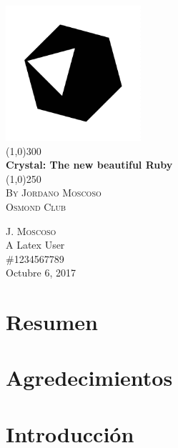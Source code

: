 \documentclass{article}
\begin{document}
\begin{titlepage}
	\begin{center}
	\includegraphics[width=5cm]{Title3-84413ce8.png}\\
	\line(1,0){300}\\
	[0.5cm]
	\huge{\bfseries Crystal: The new beautiful Ruby}\\
	[0.1cm]
	\line(1,0){250}\\
	\textsc{\LARGE By Jordano Moscoso}\\
	\textsc{\Large Osmond Club}\\
	[8cm]
	\end{center}
	\begin{flushright}
	\textsc{\large J. Moscoso}\\
	A Latex User \\
	\#1234567789 \\
	Octubre 6, 2017 \\
	\end{flushright}
\end{titlepage}

\section*{Resumen}\label{sec:summary}
\lipsum[1]
\lipsum[1]
\lipsum[1]
\cleardoublepage

\section*{Agredecimientos}\label{sec:acknowlegments}
\lipsum[1]
\cleardoublepage

\tableofcontents
\thispagestyle{empty}
\cleardoublepage

\section{Introducción}\label{sec:intro}
\lipsum[1]
\lipsum[1]
\setcounter{page}{1}
\newpage
\end{document}
